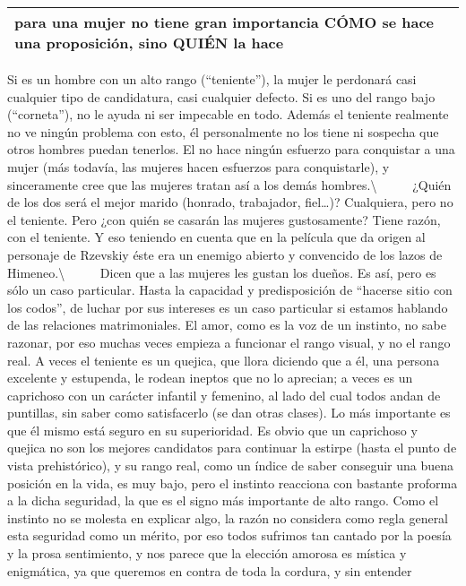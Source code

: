 \begin{longtable}[]{@{}l@{}}
\toprule
para una mujer no tiene gran importancia CÓMO se hace una proposición,
sino QUIÉN la hace\tabularnewline
\bottomrule
\end{longtable}

Si es un hombre con un alto rango (``teniente''), la mujer le perdonará
casi cualquier tipo de candidatura, casi cualquier defecto. Si es uno
del rango bajo (``corneta''), no le ayuda ni ser impecable en todo.
Además el teniente realmente no ve ningún problema con esto, él
personalmente no los tiene ni sospecha que otros hombres puedan
tenerlos. El no hace ningún esfuerzo para conquistar a una mujer (más
todavía, las mujeres hacen esfuerzos para conquistarle), y sinceramente
cree que las mujeres tratan así a los demás hombres.\textbackslash{} ~ ~
~ ¿Quién de los dos será el mejor marido (honrado, trabajador,
fiel\ldots{})? Cualquiera, pero no el teniente. Pero ¿con quién se
casarán las mujeres gustosamente? Tiene razón, con el teniente. Y eso
teniendo en cuenta que en la película que da origen al personaje de
Rzevskiy éste era un enemigo abierto y convencido de los lazos de
Himeneo.\textbackslash{} ~ ~ ~ Dicen que a las mujeres les gustan los
dueños. Es así, pero es sólo un caso particular. Hasta la capacidad y
predisposición de ``hacerse sitio con los codos'', de luchar por sus
intereses es un caso particular si estamos hablando de las relaciones
matrimoniales. El amor, como es la voz de un instinto, no sabe razonar,
por eso muchas veces empieza a funcionar el rango visual, y no el rango
real. A veces el teniente es un quejica, que llora diciendo que a él,
una persona excelente y estupenda, le rodean ineptos que no lo aprecian;
a veces es un caprichoso con un carácter infantil y femenino, al lado
del cual todos andan de puntillas, sin saber como satisfacerlo (se dan
otras clases). Lo más importante es que él mismo está seguro en su
superioridad. Es obvio que un caprichoso y quejica no son los mejores
candidatos para continuar la estirpe (hasta el punto de vista
prehistórico), y su rango real, como un índice de saber conseguir una
buena posición en la vida, es muy bajo, pero el instinto reacciona con
bastante proforma a la dicha seguridad, la que es el signo más
importante de alto rango. Como el instinto no se molesta en explicar
algo, la razón no considera como regla general esta seguridad como un
mérito, por eso todos sufrimos tan cantado por la poesía y la prosa
sentimiento, y nos parece que la elección amorosa es mística y
enigmática, ya que queremos en contra de toda la cordura, y sin entender

